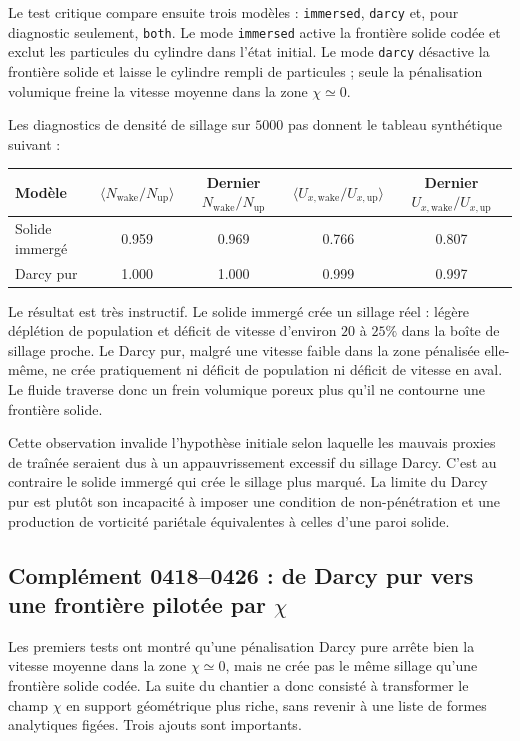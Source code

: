 \documentclass[11pt,a4paper]{article}
\begin{document}
Le test critique compare ensuite trois modèles : \texttt{immersed}, \texttt{darcy} et, pour diagnostic seulement, \texttt{both}. Le mode \texttt{immersed} active la frontière solide codée et exclut les particules du cylindre dans l'état initial. Le mode \texttt{darcy} désactive la frontière solide et laisse le cylindre rempli de particules ; seule la pénalisation volumique freine la vitesse moyenne dans la zone $\chi\simeq0$.

Les diagnostics de densité de sillage sur $5000$ pas donnent le tableau synthétique suivant :
\begin{center}
\begin{tabular}{lcccc}
\toprule
Modèle & $\langle N_{\mathrm{wake}}/N_{\mathrm{up}}\rangle$ & Dernier $N_{\mathrm{wake}}/N_{\mathrm{up}}$ & $\langle U_{x,\mathrm{wake}}/U_{x,\mathrm{up}}\rangle$ & Dernier $U_{x,\mathrm{wake}}/U_{x,\mathrm{up}}$\\
\midrule
Solide immergé & 0.959 & 0.969 & 0.766 & 0.807\\
Darcy pur & 1.000 & 1.000 & 0.999 & 0.997\\
\bottomrule
\end{tabular}
\end{center}
Le résultat est très instructif. Le solide immergé crée un sillage réel : légère déplétion de population et déficit de vitesse d'environ $20$ à $25\%$ dans la boîte de sillage proche. Le Darcy pur, malgré une vitesse faible dans la zone pénalisée elle-même, ne crée pratiquement ni déficit de population ni déficit de vitesse en aval. Le fluide traverse donc un frein volumique poreux plus qu'il ne contourne une frontière solide.

Cette observation invalide l'hypothèse initiale selon laquelle les mauvais proxies de traînée seraient dus à un appauvrissement excessif du sillage Darcy. C'est au contraire le solide immergé qui crée le sillage plus marqué. La limite du Darcy pur est plutôt son incapacité à imposer une condition de non-pénétration et une production de vorticité pariétale équivalentes à celles d'une paroi solide.



\subsection{Complément 0418--0426 : de Darcy pur vers une frontière pilotée par \texorpdfstring{$\chi$}{chi}}

Les premiers tests ont montré qu'une pénalisation Darcy pure arrête bien la vitesse moyenne dans la zone $\chi\simeq0$, mais ne crée pas le même sillage qu'une frontière solide codée. La suite du chantier a donc consisté à transformer le champ $\chi$ en support géométrique plus riche, sans revenir à une liste de formes analytiques figées. Trois ajouts sont importants.
\end{document}
